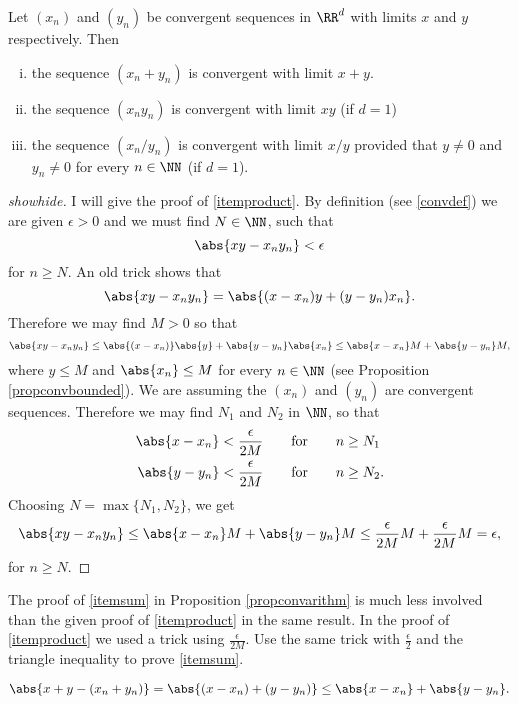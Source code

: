 \documentclass{article}
\begin{document}
\begin{proposition}\label{propconvarithm}
Let $(x_n)$ and $(y_n)$ be convergent sequences in $\RR^d$ with limits
$x$ and $y$ respectively. Then
\begin{enumerate}[(i)]
\item\label{itemsum}
the sequence $(x_n + y_n)$ is convergent with limit $x + y$.
\item\label{itemproduct}
the sequence $(x_n y_n)$ is convergent with limit $x y$ (if $d=1$)
\item
the sequence $(x_n/y_n)$ is convergent with limit $x/y$ provided
that $y\neq 0$ and $y_n \neq 0$ for every $n\in\NN$ (if $d=1$).
\end{enumerate}
\end{proposition}
  \begin{proof}[showhide]
    I will give the proof of \ref{itemproduct}. By definition (see
    \eqref{convdef}) we are given $\epsilon > 0$ and we must find
    $N\in \NN$, such that
    $$
    \abs{x y - x_n y_n} < \epsilon
    $$
    for $n\geq N$. An old trick shows that
    $$
    \abs{x y - x_n y_n} = \abs{(x-x_n) y + (y - y_n) x_n}.
    $$
    Therefore we may find $M > 0$ so that 
    $$
    \abs{x y - x_n y_n} \leq \abs{(x-x_n)}\abs{y} + \abs{y - y_n}\abs{ x_n} \leq \abs{x-x_n} M + \abs{y-y_n} M,
    $$
    where $y \leq M$ and $\abs{x_n}\leq M$ for every $n\in \NN$ (see Proposition \ref{propconvbounded}).
    We are assuming the $(x_n)$ and $(y_n)$ are convergent sequences. Therefore we may find
    $N_1$ and $N_2$ in $\NN$, so that
    \begin{align*}
      \abs{x - x_n} &< \frac{\epsilon}{2 M}\qquad\text{for}\qquad n \geq N_1\\
      \abs{y - y_n} &< \frac{\epsilon}{2 M}\qquad\text{for}\qquad n \geq N_2.
    \end{align*}
    Choosing $N = \max\{N_1, N_2\}$, we get
    $$
    \abs{x y - x_n y_n} \leq \abs{x-x_n} M + \abs{y-y_n} M \leq \frac{\epsilon}{2 M} M + \frac{\epsilon}{2 M} M = \epsilon,
    $$
    for $n\geq N$.
  \end{proof}



\beginshex
The proof of \ref{itemsum} in Proposition \ref{propconvarithm} is much less involved
than the given proof of \ref{itemproduct} in the same result. In the proof of
\ref{itemproduct} we used a trick using $\frac{\epsilon}{2M}$. Use the same
trick with $\frac{\epsilon}{2}$ and the triangle inequality to prove
\ref{itemsum}.
\begin{hint}
  $$
  \abs{x + y - (x_n + y_n)} = \abs{(x - x_n) + (y - y_n)} \leq \abs{x - x_n} + \abs{y - y_n}. 
  $$
\end{hint}
\endshex
\end{document}
